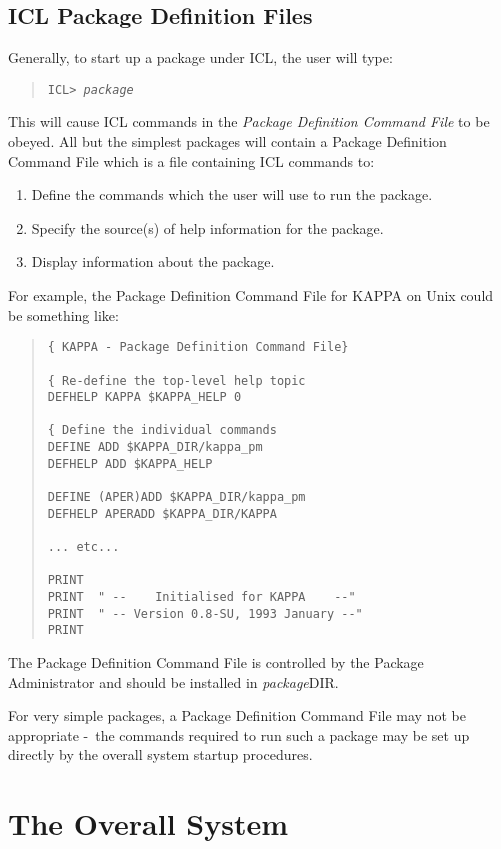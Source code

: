 \documentclass[twoside,11pt]{article}
\newcommand{\xref}[3]{#1}
\newcommand{\xlabel}[1]{}
\renewcommand{\_}{\texttt{\symbol{95}}}
\newcommand{\dash}{--}
\renewcommand{\dash}{-}
\begin{document}
\subsection{\xlabel{icl_package_definition_files}ICL Package Definition Files}
Generally, to start up a package under
\xref{ICL}{sg5}{}, the user will type:
\begin{quote}
\texttt{ICL> \textit{package}}
\end{quote}
This will cause ICL commands in the \textit{Package Definition Command File} to be
obeyed. All but the simplest packages will contain a Package Definition
Command File which is a file containing ICL commands to:
\begin{enumerate}
\item Define the commands which the user will use to run the package.
\item Specify the source(s) of help information for the package.
\item Display information about the package.
\end{enumerate}
For example, the Package Definition Command File for KAPPA on Unix
could be something like:
\begin{quote}
\begin{verbatim}
{ KAPPA - Package Definition Command File}

{ Re-define the top-level help topic
DEFHELP KAPPA $KAPPA_HELP 0

{ Define the individual commands
DEFINE ADD $KAPPA_DIR/kappa_pm
DEFHELP ADD $KAPPA_HELP

DEFINE (APER)ADD $KAPPA_DIR/kappa_pm
DEFHELP APERADD $KAPPA_DIR/KAPPA

... etc...

PRINT
PRINT  " --    Initialised for KAPPA    --"
PRINT  " -- Version 0.8-SU, 1993 January --"
PRINT
\end{verbatim}
\end{quote}

The Package Definition Command File is controlled by the Package Administrator
and should be installed in \textit{package}\_DIR.

For very simple packages, a Package Definition Command File may not be
appropriate \dash\ the commands required to run such a package may be set up
directly by the overall system startup procedures.

\section{\xlabel{the_overall_system}The Overall System}
\end{document}
